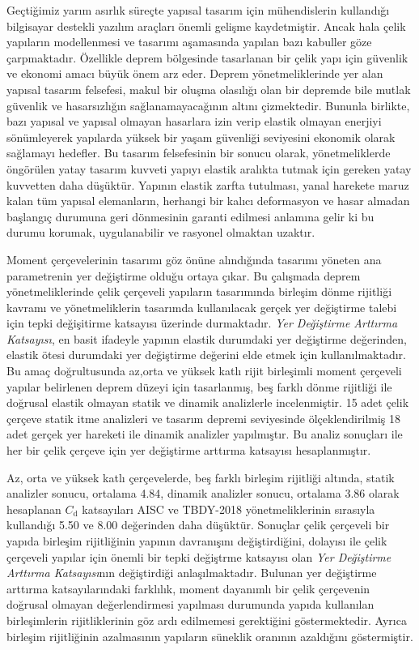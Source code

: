Geçtiğimiz yarım asırlık süreçte yapısal tasarım için mühendislerin
kullandığı bilgisayar destekli yazılım araçları önemli gelişme kaydetmiştir.
Ancak hala çelik yapıların modellenmesi ve tasarımı aşamasında yapılan
bazı kabuller göze çarpmaktadır. Özellikle deprem bölgesinde tasarlanan
bir çelik yapı için güvenlik ve ekonomi amacı büyük önem arz eder.
Deprem yönetmeliklerinde yer alan yapısal tasarım felsefesi, makul
bir oluşma olasılığı olan bir depremde bile mutlak güvenlik ve hasarsızlığın
sağlanamayacağının altını çizmektedir. Bununla birlikte, bazı yapısal
ve yapısal olmayan hasarlara izin verip elastik olmayan enerjiyi sönümleyerek
yapılarda yüksek bir yaşam güvenliği seviyesini ekonomik olarak sağlamayı
hedefler. Bu tasarım felsefesinin bir sonucu olarak, yönetmeliklerde
öngörülen yatay tasarım kuvveti yapıyı elastik aralıkta tutmak için
gereken yatay kuvvetten daha düşüktür. Yapının elastik zarfta tutulması,
yanal harekete maruz kalan tüm yapısal elemanların, herhangi bir kalıcı
deformasyon ve hasar almadan başlangıç durumuna geri dönmesinin garanti
edilmesi anlamına gelir ki bu durumu korumak, uygulanabilir ve rasyonel
olmaktan uzaktır. 

Moment çerçevelerinin tasarımı göz önüne alındığında tasarımı yöneten
ana parametrenin yer değiştirme olduğu ortaya çıkar. Bu çalışmada
deprem yönetmeliklerinde çelik çerçeveli yapıların tasarımında birleşim
dönme rijitliği kavramı ve yönetmeliklerin tasarımda kullanılacak
gerçek yer değiştirme talebi için tepki değişitirme katsayısı üzerinde
durmaktadır. \emph{Yer Değiştirme Arttırma Katsayısı}, en basit ifadeyle
yapının elastik durumdaki yer değiştirme değerinden, elastik ötesi
durumdaki yer değiştirme değerini elde etmek için kullanılmaktadır.
Bu amaç doğrultusunda az,orta ve yüksek katlı rijit birleşimli moment
çerçeveli yapılar belirlenen deprem düzeyi için tasarlanmış, beş farklı
dönme rijitliği ile doğrusal elastik olmayan statik ve dinamik analizlerle
incelenmiştir. 15 adet çelik çerçeve statik itme analizleri ve tasarım
depremi seviyesinde ölçeklendirilmiş 18 adet gerçek yer hareketi ile
dinamik analizler yapılmıştır. Bu analiz sonuçları ile her bir çelik
çerçeve için yer değiştirme arttırma katsayısı hesaplanmıştır.

Az, orta ve yüksek katlı çerçevelerde, beş farklı birleşim rijitliği
altında, statik analizler sonucu, ortalama 4.84, dinamik analizler
sonucu, ortalama 3.86 olarak hesaplanan $C_{\mathrm{d}}$ katsayıları
AISC ve TBDY-2018 yönetmeliklerinin sırasıyla kullandığı 5.50 ve 8.00
değerinden daha düşüktür. Sonuçlar çelik çerçeveli bir yapıda birleşim
rijitliğinin yapının davranışını değiştirdiğini, dolayısı ile çelik
çerçeveli yapılar için önemli bir tepki değiştrme katsayısı olan \emph{Yer
Değiştirme Arttırma Katsayısı}nın değiştirdiği anlaşılmaktadır. Bulunan
yer değiştirme arttırma katsayılarındaki farklılık, moment dayanımlı
bir çelik çerçevenin doğrusal olmayan değerlendirmesi yapılması durumunda
yapıda kullanılan birleşimlerin rijitliklerinin göz ardı edilmemesi
gerektiğini göstermektedir. Ayrıca birleşim rijitliğinin azalmasının
yapıların süneklik oranının azaldığını göstermiştir.